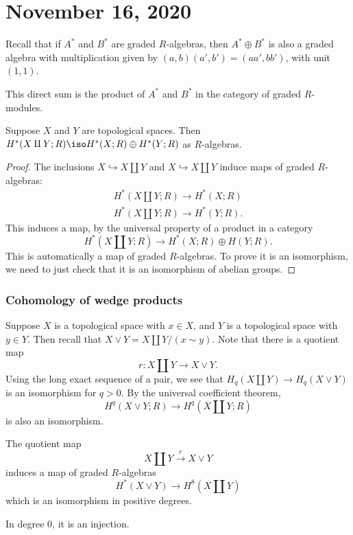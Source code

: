 \documentclass{standalone}
\begin{document}
\chapter{November 16, 2020}

Recall that if \(A^*\) and \(B^*\) are graded \(R\)-algebras, then
\(A^* \oplus B^*\) is also a graded algebra with multiplication given by
\((a, b)(a', b') = (aa', bb')\), with unit \((1, 1)\).

\begin{remark}
  This direct sum is the product of \(A^*\) and \(B^*\) in
  the category of graded \(R\)-modules.
\end{remark}

\begin{proposition}
  Suppose \(X\) and \(Y\) are topological spaces. Then
  \(H^*(X \amalg Y; R) \iso H^*(X; R) \oplus H^*(Y; R)\)
  as \(R\)-algebras.
\end{proposition}
\begin{proof}
  The inclusions \(X \hookrightarrow X \amalg Y\) and
                 \(X \hookrightarrow X \amalg Y\) induce maps
                 of graded \(R\)-algebras:
  \begin{gather*}
    H^*(X \amalg Y; R) \to H^*(X; R) \\
    H^*(X \amalg Y; R) \to H^*(Y; R).
  \end{gather*}
  This induces a map, by the universal property of a product in a category
  \[
    H^*(X \amalg Y; R) \to H^*(X; R) \oplus H(Y; R).
  \]
  This is automatically a map of graded \(R\)-algebras.
  To prove it is an isomorphism, we need to just check that it
  is an isomorphism of abelian groups.
\end{proof}



\subsection{Cohomology of wedge products}
Suppose \(X\) is a topological space with \(x \in X\), and
        \(Y\) is a topological space with \(y \in Y\).
Then recall that \(X \vee Y = X \amalg Y / (x \sim y)\).
Note that there is a quotient map
\[
  r \colon X \amalg Y \to X \vee Y.
\]
Using the long exact sequence of a pair, %
we see that \(H_q(X \amalg Y) \to H_q(X \vee Y)\)
is an isomorphism for \(q > 0\).
By the universal coefficient theorem,
\[
  H^q(X \vee Y; R) \to H^q(X \amalg Y; R)
\]
is also an isomorphism.

\begin{corollary}
  The quotient map
  \[
    X \amalg Y \overset{r}{\to} X \vee Y
  \]
  induces a map of graded \(R\)-algebras
  \[
    H^*(X \vee Y) \to H^8(X \amalg Y)
  \]
  which is an isomorphism in positive degrees.
\end{corollary}
In degree \(0\), it is an injection.
\end{document}
